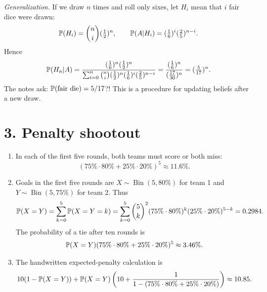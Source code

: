 \documentclass[a4paper]{article}
\begin{document}
\textit{Generalization.} If we draw $n$ times and roll only sixes, let $H_i$ mean that $i$ fair dice were drawn:
\[
\P(H_i)=\binom ni(\tfrac12)^n,\qquad
\P(A|H_i)=(\tfrac16)^i(\tfrac25)^{n-i}.
\]
Hence
\[
\P(H_n|A)=\frac{(\frac16)^n(\frac12)^n}
{\sum_{i=0}^n\binom ni(\frac12)^n(\frac16)^i(\frac25)^{n-i}}
=\frac{(\frac16)^n}{(\frac{17}{30})^n}=(\tfrac5{17})^n.
\]
The notes ask: $\P(\text{fair die})=5/17$?!
This is a procedure for updating beliefs after a new draw.

\section*{3. Penalty shootout}
\begin{enumerate}
\item In each of the first five rounds, both teams must score or both miss:
\[
(75\%\cdot80\%+25\%\cdot20\%)^5\approx11.6\%.
\]
\item Goals in the first five rounds are $X\sim\operatorname{Bin}(5,80\%)$ for team 1 and $Y\sim\operatorname{Bin}(5,75\%)$ for team 2. Thus
\[
\P(X=Y)=\sum_{k=0}^5\P(X=Y=k)
=\sum_{k=0}^5\binom5k^2(75\%\cdot80\%)^k(25\%\cdot20\%)^{5-k}=0.2984.
\]
The probability of a tie after ten rounds is
\[
\P(X=Y)(75\%\cdot80\%+25\%\cdot20\%)^5\approx3.46\%.
\]
\item The handwritten expected-penalty calculation is
\[
10(1-\P(X=Y))+
\P(X=Y)\left(10+\frac1{1-(75\%\cdot80\%+25\%\cdot20\%)}\right)
\approx10.85.
\]
\end{enumerate}
\end{document}
